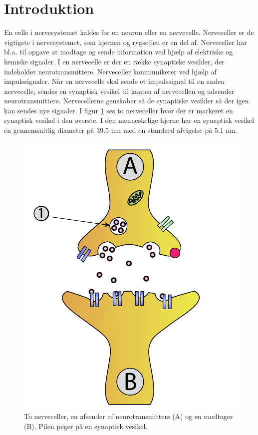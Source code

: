 \thispagestyle{plain}
\section{Introduktion}
\pagestyle{headings}
En celle i nervesystemet kaldes for en neuron eller en nervecelle. Nerveceller er de vigtigste i nervesystemet, som hjernen og rygsøjlen er en del af.
Nerveceller har bl.a. til opgave at modtage og sende information ved hjælp af elektriske og kemiske signaler. I en nervecelle er der en række synaptiske vesikler, der indeholder neurotransmittere\cite{synapticvesicle}. Nerveceller kommunikerer ved hjælp af impulssignaler. Når en nervecelle skal sende et impulssignal til en anden nervecelle, sendes en synaptisk vesikel til kanten af nervecellen og udsender neurotransmittere. Nervecellerne genskaber så de synaptiske vesikler så der igen kan sendes nye signaler. I figur \ref{fig:intro_syntrans} ses to nerveceller hvor der er markeret en synaptisk vesikel i den øverste. I den menneskelige hjerne har en synaptisk vesikel en gennemsnitlig diameter på 39.5 nm med en standard afvigelse på 5.1 nm.
\begin{figure}[H]
	\centering
	\includegraphics[scale=0.2]{files/intro/img/synTransmitter.png}
	\caption{To nerveceller, en afsender af neurotransmitters (A) og en modtager (B). Pilen peger på en synaptisk vesikel.\label{fig:intro_syntrans}\cite{neuron}}
\end{figure} 

